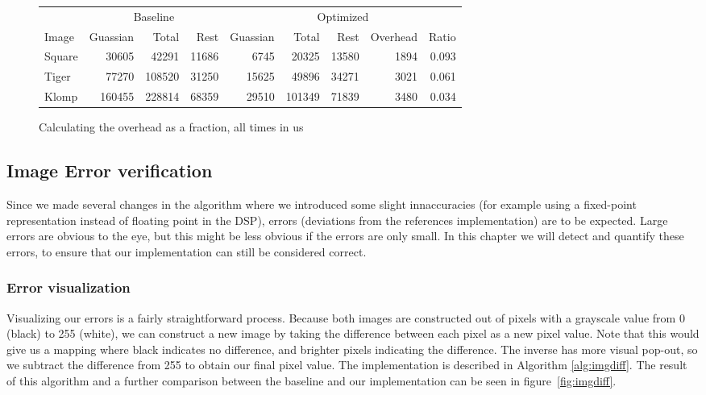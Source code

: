 \begin{figure*}
\centering
\begin{tabular}{l | r r r | r r r r r}
        & \multicolumn{3}{|c|}{Baseline}    & \multicolumn{5}{|c}{Optimized}                        \\
Image   & Guassian  & Total     & Rest      & Guassian  & Total     & Rest  & Overhead  & Ratio     \\
\hline
Square  & 30605     & 42291     & 11686     & 6745      & 20325     & 13580 & 1894      & 0.093     \\
Tiger   & 77270     & 108520    & 31250     & 15625     & 49896     & 34271 & 3021      & 0.061     \\
Klomp   & 160455    & 228814    & 68359     & 29510     & 101349    & 71839 & 3480      & 0.034     \\
\end{tabular}
\caption{Calculating the overhead as a fraction, all times in us}
\label{tab:overhead}
\end{figure*}

\subsection{Image Error verification}
Since we made several changes in the algorithm where we introduced some slight innaccuracies (for example using a fixed-point representation instead of floating point in the DSP), errors (deviations from the references implementation) are to be expected. Large errors are obvious to the eye, but this might be less obvious if the errors are only small. In this chapter we will detect and quantify these errors, to ensure that our implementation can still be considered correct.

\subsubsection{Error visualization}
Visualizing our errors is a fairly straightforward process. Because both images are constructed out of pixels with a grayscale value from 0 (black) to 255 (white), we can construct a new image by taking the difference between each pixel as a new pixel value. Note that this would give us a mapping where black indicates no difference, and brighter pixels indicating the difference. The inverse has more visual pop-out, so we subtract the difference from 255 to obtain our final pixel value. The implementation is described in Algorithm \ref{alg:imgdiff}. The result of this algorithm and a further comparison between the baseline and our implementation can be seen in figure~\ref{fig:imgdiff}.

